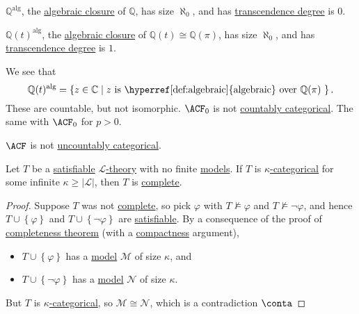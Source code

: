 \begin{eg}
	\(\mathbb{Q} ^\text{alg} \), the \hyperref[def:algebraic-closure]{algebraic closure} of \(\mathbb{Q} \), has size \(\aleph_0\), and has \hyperref[def:transcendence-degree]{transcendence degree} is \(0\).
\end{eg}

\begin{eg}
	\(\mathbb{Q} (t)^\text{alg} \), the \hyperref[def:algebraic-closure]{algebraic closure} of \(\mathbb{Q} (t) \cong \mathbb{Q} (\pi )\), has size \(\aleph_0\), and has \hyperref[def:transcendence-degree]{transcendence degree} is \(1\).
\end{eg}
\begin{explanation}
	We see that
	\[
		\mathbb{Q} (t)^{\text{alg} } = \left\{ z\in \mathbb{C} \mid \text{\(z\) is \hyperref[def:algebraic]{algebraic} over \(\mathbb{Q} (\pi )\) }  \right\}.
	\]
	These are countable, but not isomorphic. \(\ACF_0\) is not \hyperref[def:countably-categorical]{countably categorical}. The same with \(\ACF_0\) for \(p>0\).
\end{explanation}

\begin{note}
	\(\ACF\) is not \hyperref[def:uncountably-categorical]{uncountably categorical}.
\end{note}

\begin{theorem}\label{thm:Vaught-test}
	Let \(T\) be a \hyperref[def:satisfiable]{satisfiable} \hyperref[def:theory]{\(\mathcal{L} \)-theory} with no finite \hyperref[def:model]{models}. If \(T\) is \hyperref[def:categorical]{\(\kappa \)-categorical} for some infinite \(\kappa \geq \vert \mathcal{L}  \vert \), then \(T\) is \hyperref[def:theory-complete]{complete}.
\end{theorem}
\begin{proof}
	Suppose \(T\) was not \hyperref[def:theory-complete]{complete}, so pick \(\varphi \) with \(T \not \models \varphi \) and \(T \not \models \lnot \varphi \), and hence \(T \cup \left\{ \varphi  \right\} \) and \(T \cup \left\{ \lnot \varphi  \right\} \) are \hyperref[def:satisfiable]{satisfiable}. By a consequence of the proof of \hyperref[thm:completeness]{completeness theorem} (with a \hyperref[thm:compactness]{compactness} argument),
	\begin{itemize}
		\item \(T \cup \left\{ \varphi  \right\} \) has a \hyperref[def:model]{model} \(\mathcal{M} \) of size \(\kappa \), and
		\item \(T \cup \left\{ \lnot \varphi  \right\} \) has a \hyperref[def:model]{model} \(\mathcal{N} \) of size \(\kappa \).
	\end{itemize}
	But \(T\) is \hyperref[def:categorical]{\(\kappa \)-categorical}, so \(\mathcal{M} \cong \mathcal{N} \), which is a contradiction \(\conta\)
\end{proof}

